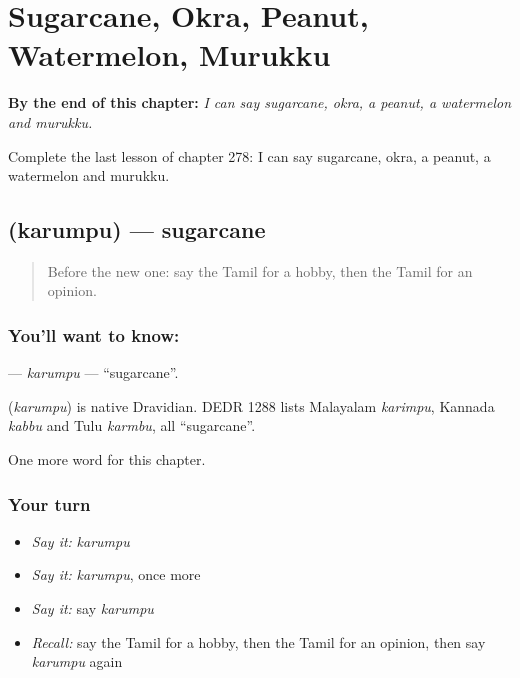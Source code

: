 
\chapter{Sugarcane, Okra, Peanut, Watermelon, Murukku}
\label{ch:ta-sugarcane-okra-peanut-watermelon-murukku}

\begin{chapteropening}
\textbf{By the end of this chapter:} \emph{I can say sugarcane, okra, a peanut, a watermelon and murukku.}

Complete the last lesson of chapter 278: I can say sugarcane, okra, a peanut, a watermelon and murukku.
\end{chapteropening}

\section[\texorpdfstring{\ta{கரும்பு} (karumpu)}{கரும்பு (karumpu)}]{ (karumpu) — sugarcane}

\label{lesson:TA-C278-karumpu}



\begin{quote}
Before the new one: say the Tamil for a hobby, then the Tamil for an opinion.
\end{quote}

\subsection*{You'll want to know: }
\textbf{} — \emph{karumpu} — \textquotedblleft{}sugarcane\textquotedblright{}.

\begin{cousinweb}
\textbf{} (\emph{karumpu}) is native Dravidian. DEDR 1288 lists Malayalam \emph{karimpu}, Kannada \emph{kabbu} and Tulu \emph{karmbu}, all \textquotedblleft{}sugarcane\textquotedblright{}.
\end{cousinweb}

\begin{grammarlens}[title={What you've built}]
One more word for this chapter.
\end{grammarlens}

\subsection*{Your turn}
\begin{itemize}
\raggedright
  \item \emph{Say it:} \emph{karumpu}
  \item \emph{Say it:} \emph{karumpu}, once more
  \item \emph{Say it:} say \emph{karumpu}
  \item \emph{Recall:} say the Tamil for a hobby, then the Tamil for an opinion, then say \emph{karumpu} again
\end{itemize}

